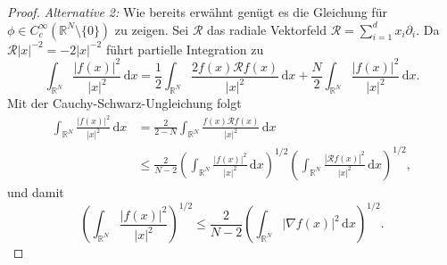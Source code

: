 \documentclass[11pt,twoside,a4paper]{article}
\theoremstyle{break}
\begin{document}
\begin{proof}
\emph{Alternative 2:} Wie bereits erwähnt genügt es die Gleichung für $\phi \in C_c^\infty(\mathbb R^N\setminus\{0\})$ zu zeigen.  Sei $\mathcal R$ das radiale Vektorfeld $\mathcal R=\sum_{i=1}^d x_i \partial_{i}$. Da $\mathcal R|x|^{-2}=-2|x|^{-2}$ führt partielle Integration zu
\begin{equation}
\int_{\mathbb R^N} \frac{|f(x)|^2}{|x|^2}\, \mathrm dx = \frac{1}{2} \int_{\mathbb R^N} \frac{2f(x) \mathcal Rf(x)}{|x|^2} \, \mathrm dx + \frac{N}{2} \int_{\mathbb R^N} \frac{|f(x)|^2}{|x|^2} \, \mathrm dx.
\end{equation}
Mit der Cauchy-Schwarz-Ungleichung folgt
\begin{align*}
\int_{\mathbb R^N} \frac{|f(x)|^2}{|x|^2} \, \mathrm dx &=  \frac{2}{2-N} \int_{\mathbb R^N} \frac{f(x) \mathcal Rf(x)}{|x|^2}\, \mathrm dx\\
&\le \frac{2}{N-2}\left ( \int_{\mathbb R^N} \frac{|f(x)|^2}{|x|^2}\, \mathrm dx \right )^{1/2} \left ( \int_{\mathbb R^N} \frac{|\mathcal R f(x)|^2}{|x|^2} \, \mathrm dx \right )^{1/2},
\end{align*}
und damit
\begin{equation}
\left (\int_{\mathbb R^N} \frac{|f(x)|^2}{|x|^2} \right )^{1/2}\le \frac{2}{N-2} \left ( \int_{\mathbb R^N} |\nabla f(x)|^2\, \mathrm dx \right )^{1/2}.
\end{equation}
\end{proof}
\end{document}
